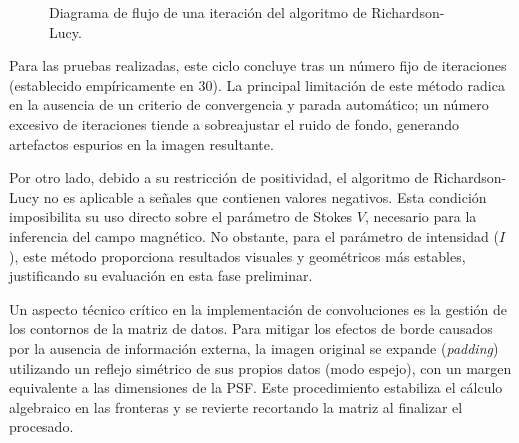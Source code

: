 \begin{figure}[H]
    \centering
    \caption{Diagrama de flujo de una iteración del algoritmo de Richardson-Lucy.}
    \label{fig:flowchart_rl}
\end{figure}

Para las pruebas realizadas, este ciclo concluye tras un número fijo de iteraciones (establecido empíricamente en 30). La principal limitación de este método radica en la ausencia de un criterio de convergencia y parada automático; un número excesivo de iteraciones tiende a sobreajustar el ruido de fondo, generando artefactos espurios en la imagen resultante.

Por otro lado, debido a su restricción de positividad, el algoritmo de Richardson-Lucy no es aplicable a señales que contienen valores negativos. Esta condición imposibilita su uso directo sobre el parámetro de Stokes $V$, necesario para la inferencia del campo magnético. No obstante, para el parámetro de intensidad ($I$), este método proporciona resultados visuales y geométricos más estables, justificando su evaluación en esta fase preliminar.

Un aspecto técnico crítico en la implementación de convoluciones es la gestión de los contornos de la matriz de datos. Para mitigar los efectos de borde causados por la ausencia de información externa, la imagen original se expande (\textit{padding}) utilizando un reflejo simétrico de sus propios datos (modo espejo), con un margen equivalente a las dimensiones de la PSF. Este procedimiento estabiliza el cálculo algebraico en las fronteras y se revierte recortando la matriz al finalizar el procesado.

